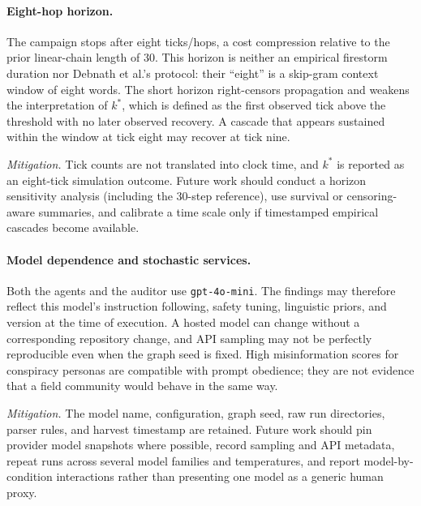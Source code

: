 \paragraph{Eight-hop horizon.}
The campaign stops after eight ticks/hops, a cost compression relative to the
prior linear-chain length of 30.  This horizon is neither an empirical firestorm
duration nor Debnath et al.'s protocol: their \enquote{eight} is a skip-gram
context window of eight words.  The short horizon right-censors propagation
and weakens the interpretation of \(k^{\ast}\), which is defined as the first
observed tick above the threshold with no later observed recovery.  A cascade
that appears sustained within the window at tick eight may recover at tick nine.

\emph{Mitigation.}  Tick counts are not translated into clock time, and
\(k^{\ast}\) is reported as an eight-tick simulation outcome.  Future work
should conduct a horizon sensitivity analysis (including the 30-step
reference), use survival or censoring-aware summaries, and calibrate a time
scale only if timestamped empirical cascades become available.

\paragraph{Model dependence and stochastic services.}
Both the agents and the auditor use \texttt{gpt-4o-mini}.  The findings may
therefore reflect this model's instruction following, safety tuning,
linguistic priors, and version at the time of execution.  A hosted model can
change without a corresponding repository change, and API sampling may not be
perfectly reproducible even when the graph seed is fixed.  High misinformation
scores for conspiracy personas are compatible with prompt obedience; they are
not evidence that a field community would behave in the same way.

\emph{Mitigation.}  The model name, configuration, graph seed, raw run
directories, parser rules, and harvest timestamp are retained.  Future work
should pin provider model snapshots where possible, record sampling and API
metadata, repeat runs across several model families and temperatures, and
report model-by-condition interactions rather than presenting one model as a
generic human proxy.

